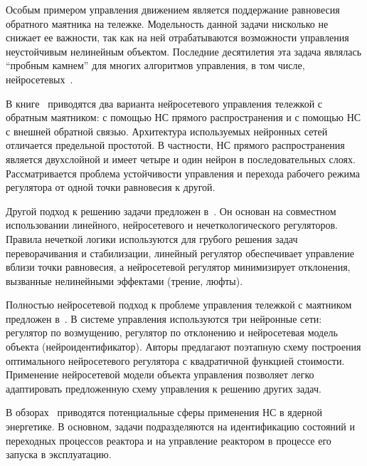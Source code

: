 
Особым примером управления движением является поддержание равновесия
обратного маятника на тележке.  Модельность данной задачи нисколько не
снижает ее важности, так как на ней отрабатываются возможности
управления неустойчивым нелинейным объектом.  Последние десятилетия
эта задача являлась ``пробным камнем'' для многих алгоритмов
управления, в том числе, нейросетевых~\cite{barto83}.

В книге~\cite{suykens96} приводятся два варианта нейросетевого
управления тележкой с обратным маятником: с помощью НС прямого
распространения и с помощью НС с внешней обратной связью.  Архитектура
используемых нейронных сетей отличается предельной простотой.  В
частности, НС прямого распространения является двухслойной и имеет
четыре и один нейрон в последовательных слоях.  Рассматривается
проблема устойчивости управления и перехода рабочего режима регулятора
от одной точки равновесия к другой.

Другой подход к решению задачи предложен в~\cite{sigom00}.  Он основан
на совместном использовании линейного, нейросетевого и
нечеткологического регуляторов.  Правила нечеткой логики используются
для грубого решения задач переворачивания и стабилизации, линейный
регулятор обеспечивает управление вблизи точки равновесия, а
нейросетевой регулятор минимизирует отклонения, вызванные нелинейными
эффектами (трение, люфты).

Полностью нейросетевой подход к проблеме управления тележкой с
маятником предложен в~\cite{park96}.  В системе управления
используются три нейронные сети: регулятор по возмущению, регулятор по
отклонению и нейросетевая модель объекта (нейроидентификатор).  Авторы
предлагают поэтапную схему построения оптимального нейросетевого
регулятора с квадратичной функцией стоимости.  Применение нейросетевой
модели объекта управления позволяет легко адаптировать предложенную
схему управления к решению других задач.


В обзорах~\cite{uhrig91,zhuchkov02} приводятся потенциальные
сферы применения НС в ядерной энергетике.  В основном, задачи
подразделяются на идентификацию состояний и переходных процессов
реактора и на управление реактором в процессе его запуска в
эксплуатацию.

